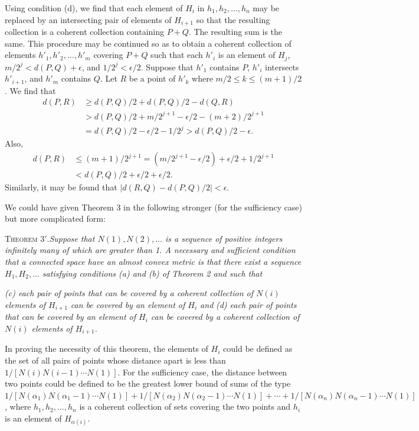 \documentclass[11pt,a4paper,leqno,twoside]{article}
\newcommand{\thm}[2]{\par\medskip\noindent\textsc{Theorem #1.}\enspace\textit{#2}\par}
\begin{document}
Using condition (d), we find that each element of $H_i$ in $h_1,h_2,\ldots,h_n$ may be replaced by an intersecting pair of elements of $H_{i+1}$ so that the resulting collection is a coherent collection containing $P+Q$. The resulting sum is the same. This procedure may be continued so as to obtain a coherent collection of elements $h'_1,h'_2,\ldots,h'_m$ covering $P+Q$ such that each $h'_i$ is an element of $H_j$, $m/2^j<d(P,Q)+\epsilon$, and $1/2^j<\epsilon/2$. Suppose that $h'_1$ contains $P$, $h'_i$ intersects $h'_{i+1}$, and $h'_m$ contains $Q$. Let $R$ be a point of $h'_k$ where $m/2\leq k\leq(m+1)/2$. We find that
\[
\begin{aligned}
d(P,R)&\geq d(P,Q)/2+d(P,Q)/2-d(Q,R)\\
&>d(P,Q)/2+m/2^{j+1}-\epsilon/2-(m+2)/2^{j+1}\\
&=d(P,Q)/2-\epsilon/2-1/2^j>d(P,Q)/2-\epsilon.
\end{aligned}
\]
Also,
\[
\begin{aligned}
d(P,R)&\leq(m+1)/2^{j+1}=(m/2^{j+1}-\epsilon/2)+\epsilon/2+1/2^{j+1}\\
&<d(P,Q)/2+\epsilon/2+\epsilon/2.
\end{aligned}
\]
Similarly, it may be found that $|d(R,Q)-d(P,Q)/2|<\epsilon$.

We could have given Theorem 3 in the following stronger (for the sufficiency case) but more complicated form:

\thm{$3'$}{Suppose that $N(1),N(2),\ldots$ is a sequence of positive integers infinitely many of which are greater than 1. A necessary and sufficient condition that a connected space have an almost convex metric is that there exist a sequence $H_1,H_2,\ldots$ satisfying conditions (a) and (b) of Theorem 2 and such that}

\textit{(c) each pair of points that can be covered by a coherent collection of $N(i)$ elements of $H_{i+1}$ can be covered by an element of $H_i$ and}
\newpage
\textit{(d) each pair of points that can be covered by an element of $H_i$ can be covered by a coherent collection of $N(i)$ elements of $H_{i+1}$.}

In proving the necessity of this theorem, the elements of $H_i$ could be defined as the set of all pairs of points whose distance apart is less than $1/[N(i)N(i-1)\cdots N(1)]$. For the sufficiency case, the distance between two points could be defined to be the greatest lower bound of sums of the type $1/[N(\alpha_1)N(\alpha_1-1)\cdots N(1)]+1/[N(\alpha_2)N(\alpha_2-1)\cdots N(1)]+\cdots+1/[N(\alpha_n)N(\alpha_n-1)\cdots N(1)]$, where $h_1,h_2,\ldots,h_n$ is a coherent collection of sets covering the two points and $h_i$ is an element of $H_{\alpha(i)}$.
\end{document}
